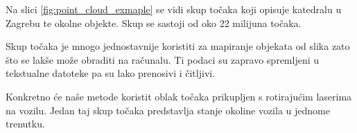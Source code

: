 Na slici \ref{fig:point_cloud_exmaple} se vidi skup točaka koji opisuje katedralu u Zagrebu te okolne objekte. Skup se sastoji od oko 22 milijuna točaka.

Skup točaka je mnogo jednostavnije koristiti za mapiranje objekata od slika zato što se lakše može obraditi na računalu. Ti podaci su zapravo spremljeni u tekstualne datoteke pa su lako prenosivi i čitljivi.

Konkretno će naše metode koristit oblak točaka prikupljen s rotirajućim laserima na vozilu. Jedan taj skup točaka predstavlja stanje okoline vozila u jednome trenutku.